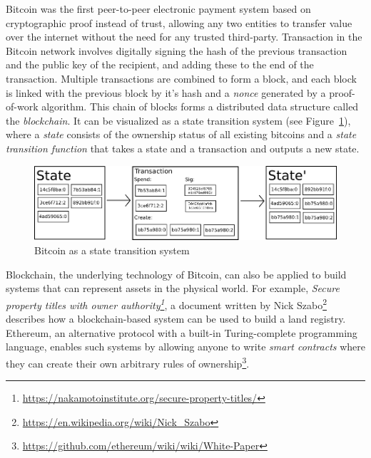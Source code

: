 	Bitcoin\cite{nakamoto2008bitcoin} was the first peer-to-peer electronic payment system based on cryptographic proof instead of trust, allowing any two entities to transfer value over the internet without the need for any trusted third-party. Transaction in the Bitcoin network involves digitally signing the hash of the previous transaction and the public key of the recipient, and adding these to the end of the transaction. Multiple transactions are combined to form a block, and each block is linked with the previous block by it's hash and a \textit{nonce} generated by a proof-of-work\cite{back2002hashcash} algorithm. This chain of blocks forms a distributed data structure called the \textit{blockchain}. It can be visualized as a state transition system (see Figure~\ref{fig:state-transition}), where a \textit{state} consists of the ownership status of all existing bitcoins and a \textit{state transition function} that takes a state and a transaction and outputs a new state\cite{buterin2014ethereum}.
	
	\begin{figure}[h]
		\includegraphics[width=\linewidth]{figures/state-transition}
		\caption{\label{fig:state-transition} Bitcoin as a state transition system\protect\footnotemark}
	\end{figure}
	
	Blockchain, the underlying technology of Bitcoin, can also be applied to build systems that can represent assets in the physical world. For example, \textit{Secure property titles with owner authority\footnote{\url{https://nakamotoinstitute.org/secure-property-titles/}}}, a document written by Nick Szabo\footnote{\url{https://en.wikipedia.org/wiki/Nick_Szabo}} describes how a blockchain-based system can be used to build a land registry. Ethereum\cite{buterin2014ethereum}, an alternative protocol with a built-in Turing-complete programming language, enables such systems by allowing anyone to write \textit{smart contracts}\cite{szabo1997formalizing} where they can create their own arbitrary rules of ownership\footnote{\url{https://github.com/ethereum/wiki/wiki/White-Paper}}.
	
